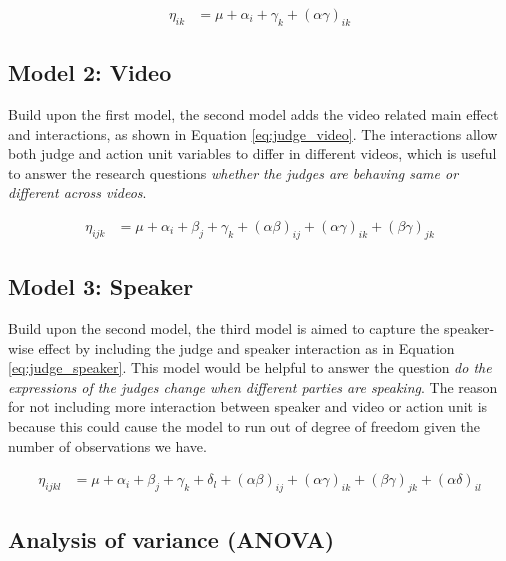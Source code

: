 \documentclass{monashthesis}
\begin{document}
\begin{align}\label{eq:judge_au}
\eta_{ik} &= \mu + \alpha_i + \gamma_k + (\alpha\gamma)_{ik}
\end{align}

\hypertarget{model-2-video}{%
\subsection{Model 2: Video}\label{model-2-video}}

Build upon the first model, the second model adds the video related main effect and interactions, as shown in Equation \ref{eq:judge_video}. The interactions allow both judge and action unit variables to differ in different videos, which is useful to answer the research questions \emph{whether the judges are behaving same or different across videos}.

\begin{align}\label{eq:judge_video}
\eta_{ijk} &= \mu + \alpha_i + \beta_j +\gamma_k + (\alpha\beta)_{ij} + (\alpha\gamma)_{ik} + (\beta\gamma)_{jk}
\end{align}

\noindent 

\hypertarget{model-3-speaker}{%
\subsection{Model 3: Speaker}\label{model-3-speaker}}

Build upon the second model, the third model is aimed to capture the speaker-wise effect by including the judge and speaker interaction as in Equation \ref{eq:judge_speaker}. This model would be helpful to answer the question \emph{do the expressions of the judges change when different parties are speaking}. The reason for not including more interaction between speaker and video or action unit is because this could cause the model to run out of degree of freedom given the number of observations we have.

\begin{align}\label{eq:judge_speaker}
\eta_{ijkl} &= \mu + \alpha_i + \beta_j +\gamma_k + \delta_l + (\alpha\beta)_{ij} + (\alpha\gamma)_{ik} + (\beta\gamma)_{jk} + (\alpha\delta)_{il}
\end{align}

\hypertarget{analysis-of-variance-anova}{%
\subsection{Analysis of variance (ANOVA)}\label{analysis-of-variance-anova}}
\end{document}
